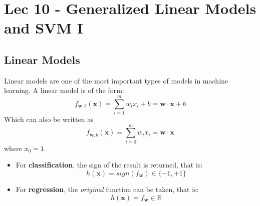 \chapter{Lec 10 - Generalized Linear Models and SVM I}
\section{Linear Models}
Linear models are one of the most important types of models in machine learning. A linear model is of the form:
\[f_{\textbf{w},b}(\textbf{x}) = \sum_{i=1}^{m} w_{i}x_{i} + b = \textbf{w} \cdot \textbf{x} + b\]
Which can also be written as
\[f_{\textbf{w},b}(\textbf{x}) = \sum_{i=0}^{m} w_{i}x_{i}= \textbf{w} \cdot \textbf{x}\]
where $x_{0} = 1$.
\begin{itemize}
    \item For \textbf{classification}, the sign of the result is returned, that is:
    \[h(\textbf{x}) = sign(f_{\textbf{w}}) \in \{-1, +1\}\]

    \item For \textbf{regression}, the \textit{original} function can be taken, that is:
    \[h(\textbf{x}) = f_{\textbf{w}} \in \mathbb{R}\]
\end{itemize}
